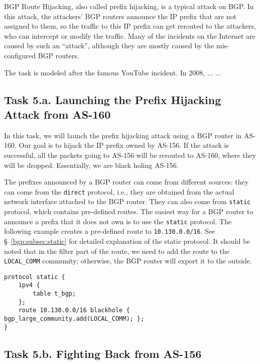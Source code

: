 BGP Route Hijacking, also called prefix hijacking, is a typical
attack on BGP. In this attack, the attackers' BGP routers 
announce the IP prefix that are not assigned to them, so
the traffic to this IP prefix can get rerouted to the 
attackers, who can intercept or modify the traffic.
Many of the incidents on the Internet are caused by
such an ``attack'', although they are mostly caused 
by the mis-configured BGP routers.


The task is modeled after the famous YouTube incident. In 2008, ...
...


\subsection{Task 5.a. Launching the Prefix Hijacking Attack from AS-160} 

In this task, we will launch the prefix hijacking attack
using a BGP router in AS-160. Our goal is to hijack
the IP prefix owned by AS-156. If the attack is successful,
all the packets going to AS-156 will be rerouted to AS-160, where
they will be dropped. Essentially, we are black holing AS-156.

The prefixes announced by a BGP router can come from different 
sources: they can come from the \texttt{direct} protocol, 
i.e., they are obtained from the actual network interface attached
to the BGP router. They can also come from \texttt{static} protocol,
which contains pre-defined routes. The easiest way for a BGP router to 
announce a prefix that it does not own is to use 
the \texttt{static} protocol. The following  
example creates a pre-defined route to \texttt{10.130.0.0/16}. 
See \S~\ref{bgp:subsec:static} for detailed explanation of the static protocol.
It should be noted that in the filter part of the route,
we need to add the route to the \texttt{LOCAL\_COMM} community; 
otherwise, the BGP router will export it to the outside.   

\begin{lstlisting}
protocol static {
    ipv4 {
        table t_bgp;
    };
    route 10.130.0.0/16 blackhole { bgp_large_community.add(LOCAL_COMM); };
}
\end{lstlisting}


\subsection{Task 5.b. Fighting Back from AS-156} 

